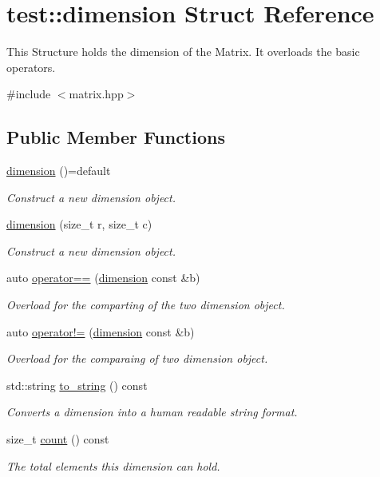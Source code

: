 \hypertarget{structtest_1_1dimension}{}\section{test\+::dimension Struct Reference}
\label{structtest_1_1dimension}


This Structure holds the dimension of the Matrix. It overloads the basic operators.  




{\ttfamily \#include $<$matrix.\+hpp$>$}

\subsection*{Public Member Functions}
\begin{DoxyCompactItemize}
\item 
\mbox{\hyperlink{structtest_1_1dimension_a07e66152eac33abc19208e3301c17438}{dimension}} ()=default
\begin{DoxyCompactList}\small\item\em Construct a new dimension object. \end{DoxyCompactList}\item 
\mbox{\hyperlink{structtest_1_1dimension_adb61bc8272063b8140952029b0559848}{dimension}} (size\+\_\+t r, size\+\_\+t c)
\begin{DoxyCompactList}\small\item\em Construct a new dimension object. \end{DoxyCompactList}\item 
auto \mbox{\hyperlink{structtest_1_1dimension_a4e3df1f6a81a202a23ed874fa8facba7}{operator==}} (\mbox{\hyperlink{structtest_1_1dimension}{dimension}} const \&b)
\begin{DoxyCompactList}\small\item\em Overload for the comparting of the two dimension object. \end{DoxyCompactList}\item 
auto \mbox{\hyperlink{structtest_1_1dimension_a4ccff7455f749c0d0faf8f33298e4593}{operator!=}} (\mbox{\hyperlink{structtest_1_1dimension}{dimension}} const \&b)
\begin{DoxyCompactList}\small\item\em Overload for the comparaing of two dimension object. \end{DoxyCompactList}\item 
std\+::string \mbox{\hyperlink{structtest_1_1dimension_ae48ed76d2d21cabf12ee2473b50ef9cd}{to\+\_\+string}} () const
\begin{DoxyCompactList}\small\item\em Converts a dimension into a human readable string format. \end{DoxyCompactList}\item 
size\+\_\+t \mbox{\hyperlink{structtest_1_1dimension_ad114dbd81f74e845282946305ec96b2a}{count}} () const
\begin{DoxyCompactList}\small\item\em The total elements this dimension can hold. \end{DoxyCompactList}\end{DoxyCompactItemize}
